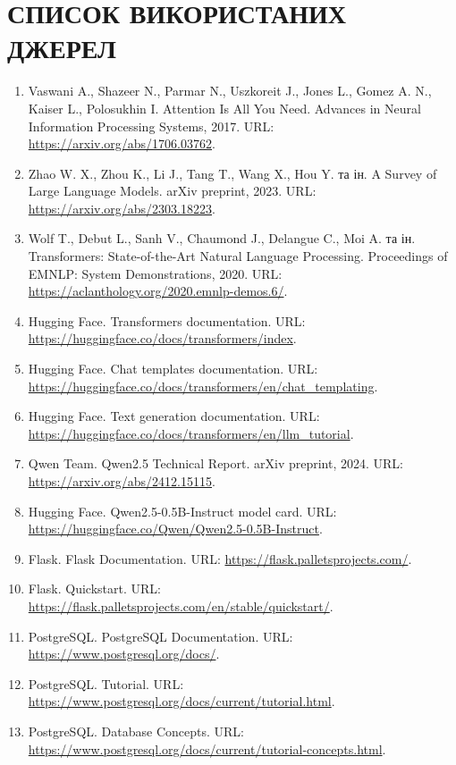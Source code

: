 \documentclass[12pt,a4paper]{article}
\begin{document}
\newpage
\section*{СПИСОК ВИКОРИСТАНИХ ДЖЕРЕЛ}

\begingroup
\small
\sloppy
\begin{enumerate}
  \item Vaswani A., Shazeer N., Parmar N., Uszkoreit J., Jones L., Gomez A. N., Kaiser L., Polosukhin I. Attention Is All You Need. Advances in Neural Information Processing Systems, 2017. URL: \url{https://arxiv.org/abs/1706.03762}.
  \item Zhao W. X., Zhou K., Li J., Tang T., Wang X., Hou Y. та ін. A Survey of Large Language Models. arXiv preprint, 2023. URL: \url{https://arxiv.org/abs/2303.18223}.
  \item Wolf T., Debut L., Sanh V., Chaumond J., Delangue C., Moi A. та ін. Transformers: State-of-the-Art Natural Language Processing. Proceedings of EMNLP: System Demonstrations, 2020. URL: \url{https://aclanthology.org/2020.emnlp-demos.6/}.
  \item Hugging Face. Transformers documentation. URL: \url{https://huggingface.co/docs/transformers/index}.
  \item Hugging Face. Chat templates documentation. URL: \url{https://huggingface.co/docs/transformers/en/chat_templating}.
  \item Hugging Face. Text generation documentation. URL: \url{https://huggingface.co/docs/transformers/en/llm_tutorial}.
  \item Qwen Team. Qwen2.5 Technical Report. arXiv preprint, 2024. URL: \url{https://arxiv.org/abs/2412.15115}.
  \item Hugging Face. Qwen2.5-0.5B-Instruct model card. URL: \url{https://huggingface.co/Qwen/Qwen2.5-0.5B-Instruct}.
  \item Flask. Flask Documentation. URL: \url{https://flask.palletsprojects.com/}.
  \item Flask. Quickstart. URL: \url{https://flask.palletsprojects.com/en/stable/quickstart/}.
  \item PostgreSQL. PostgreSQL Documentation. URL: \url{https://www.postgresql.org/docs/}.
  \item PostgreSQL. Tutorial. URL: \url{https://www.postgresql.org/docs/current/tutorial.html}.
  \item PostgreSQL. Database Concepts. URL: \url{https://www.postgresql.org/docs/current/tutorial-concepts.html}.

\end{enumerate}
\end{document}
